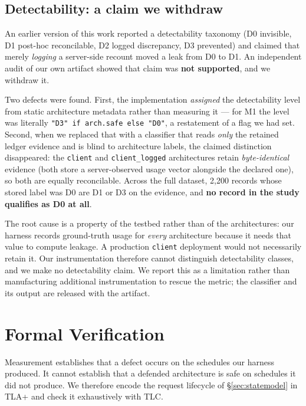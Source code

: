 \documentclass[11pt]{article}
\begin{document}
\subsection{Detectability: a claim we withdraw}
\label{sec:detect}
An earlier version of this work reported a detectability taxonomy (D0 invisible, D1
post-hoc reconcilable, D2 logged discrepancy, D3 prevented) and claimed that merely
\emph{logging} a server-side recount moved a leak from D0 to D1. An independent audit of
our own artifact showed that claim was \textbf{not supported}, and we withdraw it.

Two defects were found. First, the implementation \emph{assigned} the detectability level
from static architecture metadata rather than measuring it --- for M1 the level was
literally \texttt{"D3" if arch.safe else "D0"}, a restatement of a flag we had set.
Second, when we replaced that with a classifier that reads \emph{only} the retained
ledger evidence and is blind to architecture labels, the claimed distinction disappeared:
the \texttt{client} and \texttt{client\_logged} architectures retain
\emph{byte-identical} evidence (both store a server-observed usage vector alongside the
declared one), so both are equally reconcilable. Across the full dataset, 2{,}200 records
whose stored label was D0 are D1 or D3 on the evidence, and \textbf{no record in the study
qualifies as D0 at all}.

The root cause is a property of the testbed rather than of the architectures: our harness
records ground-truth usage for \emph{every} architecture because it needs that value to
compute leakage. A production \texttt{client} deployment would not necessarily retain it.
Our instrumentation therefore cannot distinguish detectability classes, and we make no
detectability claim. We report this as a limitation rather than manufacturing additional
instrumentation to rescue the metric; the classifier and its output are released with the
artifact.

\section{Formal Verification}
\label{sec:formal}
Measurement establishes that a defect occurs on the schedules our harness produced. It
cannot establish that a defended architecture is safe on schedules it did not produce. We
therefore encode the request lifecycle of \S\ref{sec:statemodel} in TLA+ and check it
exhaustively with TLC.
\end{document}

